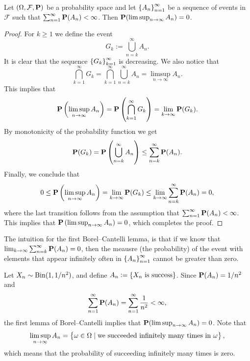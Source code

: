 \documentclass[11pt,a4paper]{article}
\begin{document}
\begin{lemma}
  Let $(\Omega, \mathcal F, \mathbf{P})$ be a probability space and let 
  $\left\{A_n\right\}_{n = 1}^{\infty}$ be a sequence of events in $\mathcal F$
  such that $\sum_{n=1}^{\infty} \mathbf{P}(A_n) < \infty$.
  Then $\mathbf{P}(\limsup_{n \to \infty} A_n) = 0$.
\end{lemma}
\begin{proof}
  For $k \geq 1$ we define the event
  \[
    G_k := \bigcup_{n=k}^{\infty} A_n.
  \]
  It is clear that the sequence $\left\{G_k\right\}_{k=1}^{\infty}$ is decreasing.
  We also notice that
  \[
    \bigcap_{k=1}^{\infty} G_k =
    \bigcap_{k=1}^{\infty} \bigcup_{n=k}^{\infty} A_n =
    \limsup_{n \to \infty} A_n.
  \]
  This implies that
  \[
    \mathbf{P}\left(\limsup_{n \to \infty} A_n\right) =
    \mathbf{P}\left(\bigcap_{k=1}^{\infty} G_k\right) =
    \lim_{k \to \infty} \mathbf{P}(G_k).
  \]
  By monotonicity of the probability function we get
  \[
    \mathbf{P}(G_k) =
    \mathbf{P}\left(\bigcup_{n=k}^{\infty} A_n\right) \le
    \sum_{n=k}^{\infty} \mathbf{P}(A_n).
  \]
  Finally, we conclude that
  \[
    0 \le \mathbf{P}\left(\limsup_{n \to \infty} A_n\right) =
    \lim_{k \to \infty} \mathbf{P}(G_k) \le
    \lim_{k \to \infty} \sum_{n=k}^{\infty} \mathbf{P}(A_n) =
    0,
  \]
  where the last transition follows from the assumption that
  $\sum_{n=1}^{\infty} \mathbf{P}(A_n) < \infty$.
  This implies that $\mathbf{P}\left(\limsup_{n \to \infty} A_n\right) = 0$,
  which completes the proof.
\end{proof}

\begin{remark}
  The intuition for the first Borel--Cantelli lemma,
  is that if we know that
  $\lim_{k \to \infty} \sum_{n=k}^{\infty} \mathbf{P}(A_n) = 0$,
  then the meausre (the probability) of the event with elements
  that appear infinitely often in $\left\{A_n\right\}_{n=1}^{\infty}$ cannot
  be greater than zero.
\end{remark}
\begin{example}
  Let $X_n \sim \operatorname{Bin}(1,1/n^2)$,
  and define $A_n := \left\{X_n \text{ is success}\right\}$.
  Since $\mathbf{P}(A_n) = 1/n^2$ and
  \[
    \sum_{n=1}^{\infty} \mathbf{P}(A_n) =
    \sum_{n=1}^{\infty} \frac{1}{n^2} < \infty,
  \]
  the first lemma of Borel--Cantelli implies that
  $\mathbf{P}(\limsup_{n \to \infty} A_n) = 0$.
  Note that
  \[
    \limsup_{n \to \infty} A_n =
    \left\{\omega \in \Omega \mid
      \text{we succeeded infinitely many times in }\omega\right\},
  \]
  which means that the probability of succeeding infinitely many times
  is zero.
\end{example}
\end{document}
